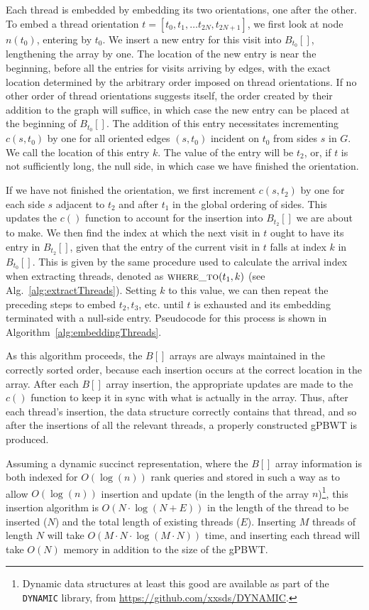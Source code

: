 Each thread is embedded by embedding its two orientations, one after the other. To embed a thread orientation $t = [t_0, t_1, \ldots t_{2N}, t_{2N+1}]$, we first look at node $n(t_0)$, entering by $t_0$. We insert a new entry for this visit into $B_{t_0}[]$, lengthening the array by one. The location of the new entry is near the beginning, before all the entries for visits arriving by edges, with the exact location determined by the arbitrary order imposed on thread orientations. If no other order of thread orientations suggests itself, the order created by their addition to the graph will suffice, in which case the new entry can be placed at the beginning of $B_{t_0}[]$. The addition of this entry necessitates incrementing $c(s, t_0)$ by one for all oriented edges $(s, t_0)$ incident on $t_0$ from sides $s$ in $G$. We call the location of this entry $k$. The value of the entry will be $t_2$, or, if $t$ is not sufficiently long, the null side, in which case we have finished the orientation. 

If we have not finished the orientation, we first increment $c(s, t_2)$ by one for each side $s$ adjacent to $t_2$ and after $t_1$ in the global ordering of sides. This updates the $c()$ function to account for the insertion into $B_{t_2}[]$ we are about to make.
We then find the index at which the next visit in $t$ ought to have its entry in $B_{t_{2}}[]$, given that the entry of the current visit in $t$ falls at index $k$ in $B_{t_{0}}[]$. This is given by the same procedure used to calculate the arrival index when extracting threads, denoted as $\Call{where\_to}{t_1, k}$ (see Alg.~\ref{alg:extractThreads}). Setting $k$ to this value, we can then repeat the preceding steps to embed $t_2, t_3$, etc. until $t$ is exhausted and its embedding terminated with a null-side entry. Pseudocode for this process is shown in Algorithm~\ref{alg:embeddingThreads}.

As this algorithm proceeds, the $B[]$ arrays are always maintained in the correctly sorted order, because each insertion occurs at the correct location in the array. After each $B[]$ array insertion, the appropriate updates are made to the $c()$ function to keep it in sync with what is actually in the array. Thus, after each thread's insertion, the data structure correctly contains that thread, and so after the insertions of all the relevant threads, a properly constructed gPBWT is produced.

Assuming a dynamic succinct representation, where the $B[]$ array information is both indexed for $O(\log(n))$ rank queries and stored in such a way as to allow $O(\log(n))$ insertion and update (in the length of the array $n$)\footnote{Dynamic data structures at least this good are available as part of the \texttt{DYNAMIC} library, from \url{https://github.com/xxsds/DYNAMIC}.}, this insertion algorithm is $O(N \cdot \log(N + E))$ in the length of the thread to be inserted ($N$) and the total length of existing threads ($E$). Inserting $M$ threads of length $N$ will take $O(M \cdot N \cdot \log(M \cdot N))$ time, and inserting each thread will take $O(N)$ memory in addition to the size of the gPBWT.

